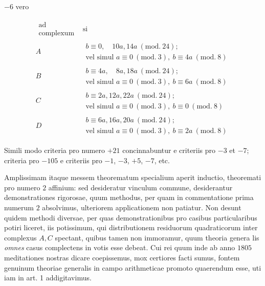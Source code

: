 \begin{center}$-6$ vero\end{center}
{\small
\[
\begin{array}{c|l}
\substack{\text{ad}\\\text{complexum}}&\text{si}\\
A&\begin{aligned}b\equiv0,\quad10a,14a\ (\mathrm{mod.}\ 24);\\\text{vel simul }a\equiv0\ (\mathrm{mod.}\ 3),\ b\equiv4a\ (\mathrm{mod.}\ 8)\end{aligned}\\
B&\begin{aligned}b\equiv4a,\quad8a,18a\ (\mathrm{mod.}\ 24);\\\text{vel simul }a\equiv0\ (\mathrm{mod.}\ 3),\ b\equiv6a\ (\mathrm{mod.}\ 8)\end{aligned}\\
C&\begin{aligned}b\equiv2a,12a,22a\ (\mathrm{mod.}\ 24);\\\text{vel simul }a\equiv0\ (\mathrm{mod.}\ 3),\ b\equiv0\ (\mathrm{mod.}\ 8)\end{aligned}\\
D&\begin{aligned}b\equiv6a,16a,20a\ (\mathrm{mod.}\ 24);\\\text{vel simul }a\equiv0\ (\mathrm{mod.}\ 3),\ b\equiv2a\ (\mathrm{mod.}\ 8)\end{aligned}
\end{array}
\]
}

Simili modo criteria pro numero $+21$ concinnabuntur e criteriis pro $-3$ et $-7$; criteria pro $-105$ e criteriis pro $-1$, $-3$, $+5$, $-7$, etc.

Amplissimam itaque messem theorematum specialium aperit inductio, theoremati pro numero $2$ affinium: sed desideratur vinculum commune, desiderantur demonstrationes rigorosae, quum methodus, per quam in commentatione prima numerum $2$ absolvimus, ulteriorem applicationem non patiatur. Non desunt quidem methodi diversae, per quas demonstrationibus pro casibus particularibus potiri liceret, iis potissimum, qui distributionem residuorum quadraticorum inter complexus $A,C$ spectant, quibus tamen non immoramur, quum theoria genera%
%
lis \emph{omnes} casus complectens in votis esse debeat. Cui rei quum inde ab anno $1805$ meditationes nostras dicare coepissemus, mox certiores facti sumus, fontem genuinum theoriae generalis in campo arithmeticae promoto quaerendum esse, uti iam in art. 1 addigitavimus.

